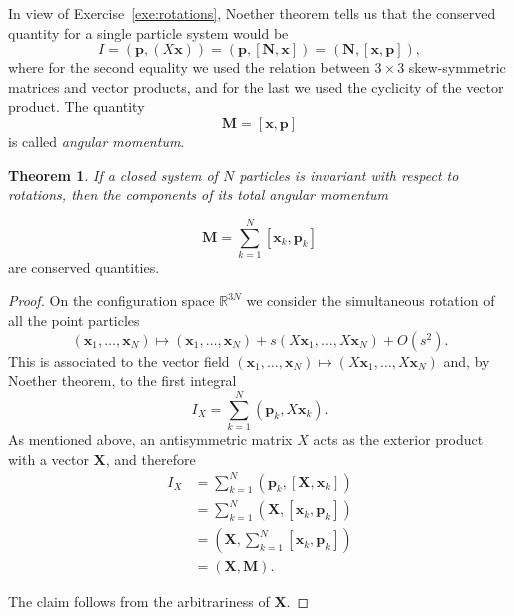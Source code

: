 \documentclass[english,fontsize=11pt,paper=a5,oneside]{scrbook}
\newcommand{\R}{\mathbb{R}}
\newcommand{\bx}{\bm{x}}
\newcommand{\bp}{\bm{p}}
\newtheorem{theorem}{Theorem}[chapter]
\theoremstyle{definition}
\begin{document}
In view of Exercise~\ref{exe:rotations}, Noether theorem tells us that the conserved quantity for a single particle system would be
\begin{equation}
    I = (\bp, (X\bx)) = (\bp, [\bm{N}, \bx]) = (\bm{N}, [\bx, \bp]),
\end{equation}
where for the second equality we used the relation between $3\times3$ skew-symmetric matrices and vector products, and for the last we used the cyclicity of the vector product.
The quantity
\begin{equation}
    \bm{M} = [\bx, \bp]
\end{equation}
is called \emph{angular momentum}.

\begin{theorem}
If a closed system of $N$ particles is invariant with respect to rotations, then the components of its \emph{total angular momentum}
\end{theorem}
\begin{equation}
    \bm{M} = \sum_{k=1}^N [\bx_k, \bp_k]
\end{equation}
are conserved quantities.
\begin{proof}
On the configuration space $\R^{3N}$ we consider the simultaneous rotation of all the point particles
\begin{equation}
(\bx_1,\ldots,\bx_N) \mapsto 
(\bx_1,\ldots,\bx_N) +
s (X\bx_1,\ldots,X\bx_N) + O(s^2).
\end{equation}
This is associated to the vector field $(\bx_1,\ldots,\bx_N) \mapsto (X\bx_1,\ldots,X\bx_N)$ and, by Noether theorem, to the first integral
\begin{equation}
    I_X = \sum_{k=1}^N (\bp_k, X\bx_k).
\end{equation}
As mentioned above, an antisymmetric matrix $X$ acts as the exterior product with a vector $\bm{X}$, and therefore
\begin{align}
    I_X &= \sum_{k=1}^N (\bp_k, [\bm{X},\bx_k]) \\
    &= \sum_{k=1}^N (\bm{X},[\bx_k, \bp_k]) \\
    &= (\bm{X}, \sum_{k=1}^N [\bx_k, \bp_k]) \\
    &= (\bm{X},\bm{M}).
\end{align}

The claim follows from the arbitrariness of $\bm{X}$.
\end{proof}
\end{document}
